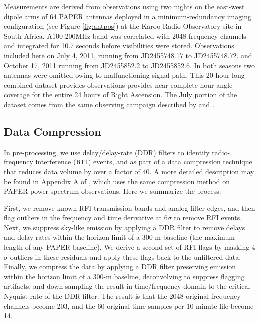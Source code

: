 \documentclass[preprint]{aastex}
\begin{document}
 Measurements are derived from observations using two nights on the east-west dipole arms of
64 PAPER antennas deployed in a minimum-redundancy imaging configuration
(see Figure \ref{fig:antpos})
at the Karoo Radio Observatory site in South Africa.
A100-200MHz band was correlated
with 2048 frequency channels and integrated for 10.7 seconds before
visibilities were stored.  Observations included here on  July 4, 2011, running
from JD2455748.17 to JD2455748.72. and October 17, 2011 running from
JD2455852.2 to JD2455852.6.  In both seasons two antennas were omitted owing to
malfunctioning signal path. This 20 hour long combined dataset provides
observations provides near complete hour angle coverage for the entire 24 hours of
Right Ascension. The July portion of the dataset comes from the same observing
campaign described by \cite{Pober:2013p9942} and \cite{Stefan:2013p9926}. 

\subsection{Data Compression}

In pre-processing, we use delay/delay-rate (DDR) filters
\citep{Parsons:2009p7859} to identify radio-frequency interference (RFI)
events, and as part of a data compression technique that reduces data volume by
over a factor of 40.  A more detailed description may be found in Appendix A of
\cite{Parsons:2013p9876}, which uses the same compression method on PAPER power
spectrum observations. Here we summarize the process.

First, we remove known RFI transmission bands and analog filter edges, and then
flag outliers in the frequency and time derivative at 6$\sigma$ to remove RFI events.  Next, we suppress sky-like
emission by applying a DDR filter to remove delays and delay-rates within the
horizon limit of a 300-m baseline (the maximum length of any PAPER baseline).
We derive a second set of RFI flags by masking 4$\sigma$ outliers in these
residuals and apply these flags back to the unfiltered data.  Finally, we
compress the data by applying a DDR filter preserving emission within the
horizon limit of a 300-m baseline, deconvolving to suppress flagging artifacts,
and down-sampling the result in time/frequency domain to the critical Nyquist
rate of the DDR filter.  The result is that the 2048 original frequency
channels become 203, and the 60 original time samples per 10-minute file become
14. 
\end{document}
